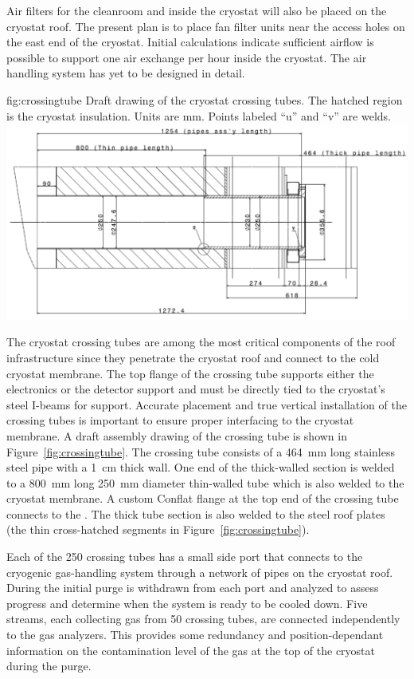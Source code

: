 Air filters for the cleanroom and inside the cryostat will also be placed on the cryostat roof. The present plan is to place fan filter units near the %
access holes on the east end of the cryostat. Initial calculations indicate sufficient airflow is possible to support one air exchange per hour inside the cryostat. The air handling system has yet to be designed in detail.


\begin{dunefigure}{fig:crossingtube}
  {Draft drawing of the cryostat crossing tubes. The hatched region is the cryostat insulation. Units are mm. Points labeled ``u'' and ``v'' are welds. }
\includegraphics[width=.85\textwidth]{graphics/crossingtube}
\end{dunefigure}
 
The cryostat crossing tubes are among the most critical components of the roof infrastructure since they penetrate the cryostat roof and connect to the cold cryostat membrane. The top flange of the crossing tube supports either the electronics \fdth or the detector support \fdth and must be directly tied to the cryostat's steel I-beams for support. 
Accurate placement and true vertical installation of the crossing tubes is important to ensure proper interfacing to the cryostat membrane. 
A draft assembly drawing of the crossing tube is shown in Figure~\ref{fig:crossingtube}. 
The crossing tube consists of a \SI{464}{mm} long stainless steel pipe with a \SI{1}{cm} thick wall. 
One end of the thick-walled section is welded to a \SI{800}{mm} long \SI{250}{mm} diameter thin-walled tube which is also welded to the cryostat membrane.
A custom Conflat flange at the top end of the crossing tube connects to the \fdth. 
The thick tube section is also welded to the steel roof plates (the thin cross-hatched segments in Figure~\ref{fig:crossingtube}).  

 
Each of the 250 crossing tubes has a small side port that connects to the cryogenic gas-handling system through a network of pipes on the cryostat roof. During the initial purge  is withdrawn from each port and analyzed to assess progress and determine when the system is ready to be cooled down. Five  streams, each collecting gas from 50 crossing tubes, are connected independently to the gas analyzers. This provides some redundancy and position-dependant information on the contamination level of the gas at the top of the cryostat during the purge.
 

